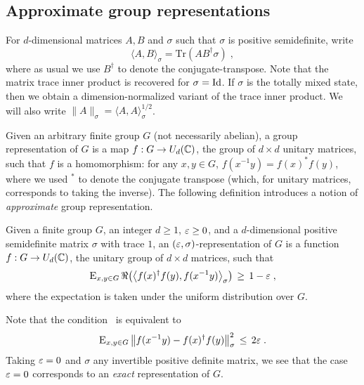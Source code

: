 \subsection{Approximate group representations}
\label{subsection-approxrep}

For $d$-dimensional matrices  $A,B$ and $\sigma$ such that $\sigma$ is positive semidefinite, write 
$$\langle A,B\rangle_\sigma = \mathrm{Tr}(AB^\dagger \sigma)\;,$$
where as usual we use $B^\dagger$ to denote the conjugate-transpose. Note that the matrix trace inner product is recovered for $\sigma = \mathop{\rm Id}\nolimits$. If $\sigma$ is the totally mixed state, then we obtain a dimension-normalized variant of the trace inner product. We will also write $\|A\|_\sigma = \langle A,A\rangle_\sigma^{1/2}$. 

Given an arbitrary finite group $G$ (not necessarily abelian), a group representation of $G$ is a map $f:G \to U_d(\mathbb{C})$, the group of $d\times d$ unitary matrices, such that $f$ is a homomorphism: for any $x,y\in G$, $f(x^{-1}y)=f(x)^* f(y)$, where we used $^*$ to denote the conjugate transpose (which, for unitary matrices, corresponds to taking the inverse). The following definition introduces a notion of \emph{approximate} group representation.  

\begin{definition}
\label{def:approx-rep}
Given a finite group $G$, an integer $d\geq 1$, $\varepsilon\geq 0$, and a $d$-dimensional positive semidefinite matrix $\sigma$ with trace $1$, an $(\varepsilon,\sigma)$-representation of $G$ is a function $f: G \to U_d(\mathbb{C})$, the unitary group of $d\times d$ matrices, such that 
\begin{equation}
\label{eq:gh-condition}
\textsc{E}_{x,y\in G} \,\Re\big(\big\langle f(x)^\dagger f(y) ,f(x^{-1}y) \big\rangle_\sigma\big) \,\geq\, 1-\varepsilon\;,
\end{equation} 
where the expectation is taken under the uniform distribution over $G$.
\end{definition}

Note that the condition~ is equivalent to 
\begin{equation}
\label{eq:gh-condition-2}
\textsc{E}_{x,y\in G} \, \big\| f(x^{-1}y) - f(x)^\dagger f(y) \big\|_\sigma^2 \,\leq\, 2\varepsilon\;.
\end{equation}
Taking $\varepsilon=0$ and $\sigma$ any invertible positive definite matrix, we see that the case $\varepsilon=0$ corresponds to an \emph{exact} representation of $G$. 

